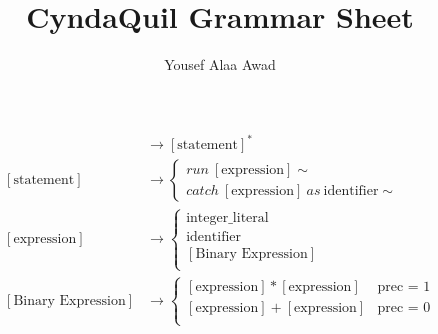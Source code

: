 \documentclass[12pt, letterpaper]{article}
\title{CyndaQuil Grammar Sheet}
\author{Yousef Alaa Awad}
\begin{document}
\maketitle
\begin{align}
  [\text{program}] &\to [\text{statement}]^* \\
  [\text{statement}] &\to \begin{cases}
    run\ [\text{expression}]\sim \\
    catch\  [\text{expression}]\ as\ \text{identifier}\sim
  \end{cases} \\
  [\text{expression}]&\to \begin{cases}
    \text{integer\_literal} \\
    \text{identifier} \\
    [\text{Binary Expression}] \\
  \end{cases} \\
  [\text{Binary Expression}] &\to \begin{cases}
    [\text{expression}] * [\text{expression}] & \text{prec = 1}\\
    [\text{expression}] + [\text{expression}] &  \text{prec = 0}\\ 
  \end{cases}
\end{align}
\end{document}
